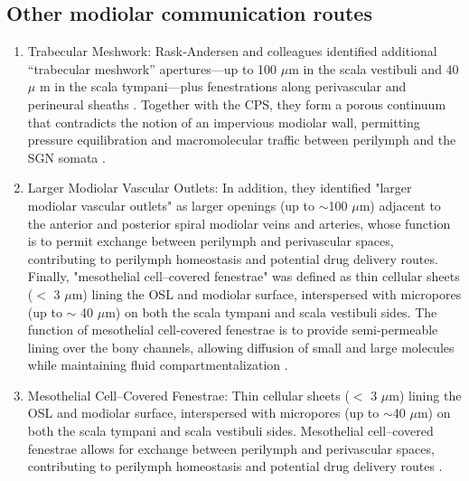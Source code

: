 \subsection{Other modiolar communication routes}  
\begin{enumerate}
\item Trabecular Meshwork: Rask‑Andersen and colleagues identified additional “trabecular meshwork” apertures—up to 100 $\mu$m in the scala vestibuli and 40 $\mu$ m in the scala tympani—plus fenestrations along perivascular and perineural sheaths \cite{raskandersen2006}.  Together with the CPS, they form a porous continuum that contradicts the notion of an impervious modiolar wall, permitting pressure equilibration and macromolecular traffic between perilymph and the SGN somata \cite{raskandersen2006, shepherd2004}.

\item Larger Modiolar Vascular Outlets: In addition, they identified "larger modiolar vascular outlets" as larger openings (up to $\sim$100 $\mu$m) adjacent to the anterior and posterior spiral modiolar veins and arteries, whose function is to permit exchange between perilymph and perivascular spaces, contributing to perilymph homeostasis and potential drug delivery routes. Finally, "mesothelial cell–covered fenestrae" was defined as thin cellular sheets ($<$ 3 $\mu$m) lining the OSL and modiolar surface, interspersed with micropores (up to $\sim$ 40 $\mu$m) on both the scala tympani and scala vestibuli sides. The function of mesothelial cell-covered fenestrae is to provide semi-permeable lining over the bony channels, allowing diffusion of small and large molecules while maintaining fluid compartmentalization \cite{raskandersen2006, shepherd2004}.

\item Mesothelial Cell–Covered Fenestrae: Thin cellular sheets ($<$ 3 $\mu$m) lining the OSL and modiolar surface, interspersed with micropores (up to $\sim$40 $\mu$m) on both the scala tympani and scala vestibuli sides. Mesothelial cell–covered fenestrae allows for exchange between perilymph and perivascular spaces, contributing to perilymph homeostasis and potential drug delivery routes \cite{raskandersen2006, shepherd2004}.

\end{enumerate}

